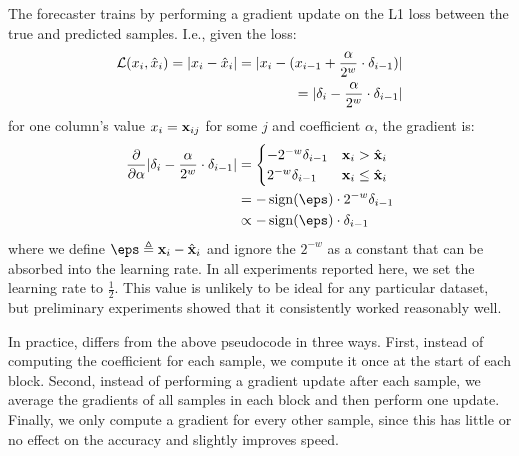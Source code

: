 The forecaster trains by performing a gradient update on the L1 loss between the true and predicted samples. I.e., given the loss:
\begin{align}
    \mathcal{L}(x_i, \hat{x}_{i}) = \lvert x_i - \hat{x}_i\rvert
    = \lvert x_i - (x_{i-1} + \frac{\alpha}{2^w} \cdot \delta_{i-1})\rvert \\
    = \lvert\delta_{i} - \frac{\alpha}{2^w} \cdot \delta_{i-1}\rvert
\end{align}
for one column's value $x_i = \mathbf{x}_{ij}$ for some $j$ and coefficient $\alpha$, the gradient is:
\begin{align}
        \frac{\partial }{\partial \alpha} \abs{\delta_{i} - \frac{\alpha}{2^w} \cdot \delta_{i-1}}
&= \begin{cases}
        -{2^{-w}}\vdelta_{i-1} & \x_{i} > \hat{\x}_{i} \\
        {2^{-w}}\vdelta_{i-1} & \x_{i} \le \hat{\x}_{i}
\end{cases} \\
&= -\sign(\eps) \cdot {2^{-w}}\vdelta_{i-1} \\
&\propto -\sign(\eps) \cdot \vdelta_{i-1}
\end{align}
where we define $\eps \triangleq \x_{i} - \hat{\x}_{i}$ and ignore the $2^{-w}$ as a constant that can be absorbed into the learning rate. In all experiments reported here, we set the learning rate to $\frac{1}{2}$. This value is unlikely to be ideal for any particular dataset, but preliminary experiments showed that it consistently worked reasonably well. %

In practice, \fire differs from the above pseudocode in three ways. First, instead of computing the coefficient for each sample, we compute it once at the start of each block. Second, instead of performing a gradient update after each sample, we average the gradients of all samples in each block and then perform one update. Finally, we only compute a gradient for every other sample, since this has little or no effect on the accuracy and slightly improves speed.

